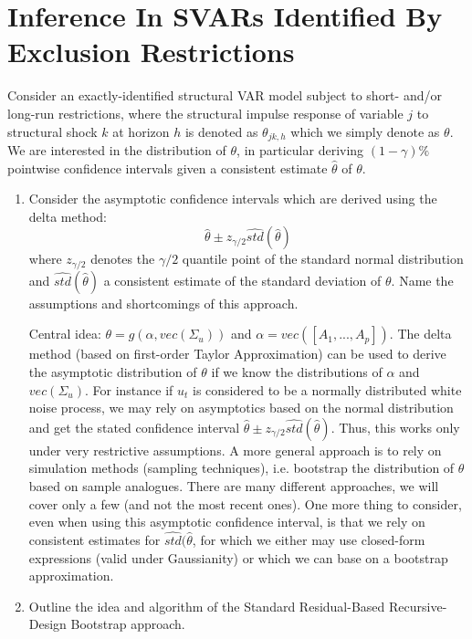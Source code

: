 \documentclass[a4paper]{scrartcl}
\begin{document}
\section{Inference In SVARs Identified By Exclusion Restrictions}
Consider an exactly-identified structural VAR model subject to short- and/or long-run restrictions, where the structural impulse response of variable $j$ to structural shock $k$ at horizon $h$ is denoted as $\theta_{jk,h}$ which we simply denote as $\theta$. We are interested in the distribution of $\theta$, in particular deriving $(1-\gamma)\%$ pointwise confidence intervals given a consistent estimate $\hat{\theta}$ of $\theta$.
\begin{enumerate}	
	\item Consider the asymptotic confidence intervals which are derived using the delta method: $$\hat{\theta} \pm z_{\gamma/2} \widehat{std}(\hat{\theta})$$ where $z_{\gamma/2}$ denotes the $\gamma/2$ quantile point of the standard normal distribution and $ \widehat{std}(\hat{\theta})$ a consistent estimate of the standard deviation of $\theta$. Name the assumptions and shortcomings of this approach.
	\begin{solution}
		Central idea: $\theta = g(\alpha,vec(\Sigma_u))$ and $\alpha = vec([A_1,...,A_p])$. The delta method (based on first-order Taylor Approximation) can be used to derive the asymptotic distribution of $\theta$ if we know the distributions of $\alpha$ and $vec(\Sigma_u)$. For instance if $u_t$ is considered to be a normally distributed white noise process, we may rely on asymptotics based on the normal distribution and get the stated confidence interval $\hat{\theta} \pm z_{\gamma/2} \widehat{std}(\hat{\theta})$. Thus, this works only under very restrictive assumptions. A more general approach is to rely on simulation methods (sampling techniques), i.e. bootstrap the distribution of $\theta$ based on sample analogues. There are many different approaches, we will cover only a few (and not the most recent ones). One more thing to consider, even when using this asymptotic confidence interval, is that we rely on consistent estimates for $\widehat{std}(\hat{\theta}$, for which we either may use closed-form expressions (valid under Gaussianity) or which we can base on a bootstrap approximation.
	\end{solution}
	\item Outline the idea and algorithm of the Standard Residual-Based Recursive-Design Bootstrap approach.
	\begin{solution}

\end{solution}
\end{enumerate}
\end{document}
